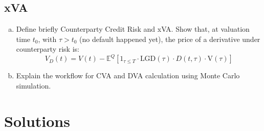 \documentclass{article}
\begin{document}
\subsection{xVA}
\begin{enumerate}[a)]
    \item Define briefly Counterparty Credit Risk and xVA. Show that, at valuation time $t_0$, with $\tau > t_0$ (no default happened yet), the price of a derivative under counterparty risk is:
    $$ V_D(t) = V(t) - \mathbb{E}^Q \left[ 1_{\tau\leq T} \cdot \text{LGD}(\tau) \cdot D(t,\tau) \cdot \text{V}(\tau) \right] $$
    \item Explain the workflow for CVA and DVA calculation using Monte Carlo simulation. 
    
    
\end{enumerate}



\newpage
\section{Solutions}
\end{document}
